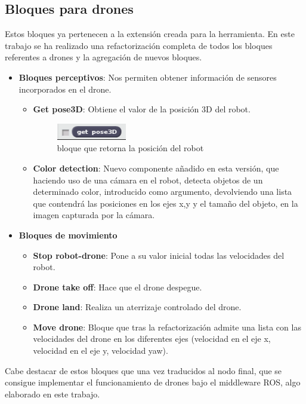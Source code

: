\subsection{Bloques para drones}
Estos bloques ya pertenecen a la extensión creada para la herramienta.
En este trabajo se ha realizado una refactorización completa de todos los bloques referentes a drones y la agregación de nuevos bloques. 
\begin{itemize}
\item \textbf{Bloques perceptivos}:
Nos permiten obtener información de sensores incorporados en el drone.
	\begin{itemize}
	\item \textbf{Get pose3D}: Obtiene el valor de la posición 3D del robot.
		\begin{figure}[H]
     		\centering
     		\includegraphics[scale=1.2]{img/block-pose.png}
     		\caption{bloque que retorna la posición del robot}
  		\label{fig:listas}
		\end{figure}
	\item \textbf{Color detection}: Nuevo componente añadido en esta versión, que haciendo uso de una cámara en el robot, detecta objetos de un determinado color, introducido como argumento, devolviendo una lista que contendrá las posiciones en los ejes x,y y el tamaño del objeto, en la imagen capturada por la cámara. 
	\end{itemize}
\item \textbf{Bloques de movimiento}
	\begin{itemize}
	\item \textbf{Stop robot-drone}: Pone a su valor inicial todas las velocidades del robot.
	\item \textbf{Drone take off}: Hace que el drone despegue.
	\item \textbf{Drone land}: Realiza un aterrizaje controlado del drone.
	\item \textbf{Move drone}: Bloque que tras la refactorización admite una lista con las velocidades del drone en los diferentes ejes (velocidad en el eje x, velocidad en el eje y, velocidad yaw).
	\end{itemize}
\end{itemize}

Cabe destacar de estos bloques que una vez traducidos al nodo final, que se consigue implementar el funcionamiento de drones bajo el middleware ROS, algo elaborado en este trabajo.\\

